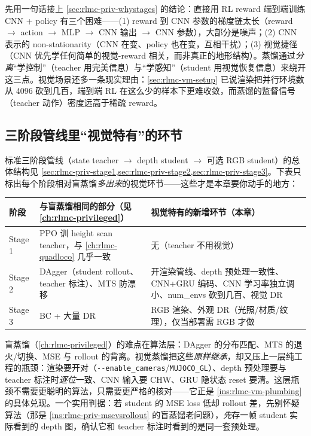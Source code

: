 先用一句话接上 \cref{sec:rlmc-priv-whystages} 的结论：直接用 RL reward 端到端训练 CNN + policy 有三个困难——(1) reward 到 CNN 参数的梯度链太长（reward $\to$ action $\to$ MLP $\to$ CNN 输出 $\to$ CNN 参数），大部分是噪声；(2) CNN 表示的 non-stationarity（CNN 在变、policy 也在变，互相干扰）；(3) 视觉捷径（CNN 优先学任何简单的视觉-reward 相关，而非真正的地形结构）。蒸馏通过\emph{分离}“学控制”（teacher 用完美信息）与“学感知”（student 用视觉恢复信息）来绕开这三点。视觉场景还多一条现实理由：\cref{sec:rlmc-vm-setup} 已说渲染把并行环境数从 4096 砍到几百，端到端 RL 在这么少的样本下更难收敛，而蒸馏的监督信号（teacher 动作）密度远高于稀疏 reward。

\subsection{三阶段管线里“视觉特有”的环节}
\label{sec:rlmc-vm-stages-vision}

标准三阶段管线（state teacher $\to$ depth student $\to$ 可选 RGB student）的总体结构见 \cref{sec:rlmc-priv-stage1,sec:rlmc-priv-stage2,sec:rlmc-priv-stage3}。下表只标出每个阶段相对盲蒸馏\emph{多出来}的视觉环节——这些才是本章要你动手的地方：

\begin{center}
\small
\begin{tabular}{@{}p{1.7cm}p{4.4cm}p{5.6cm}@{}}
\toprule
阶段 & 与盲蒸馏相同的部分（见 \cref{ch:rlmc-privileged}） & 视觉特有的新增环节（本章） \\
\midrule
Stage 1 & PPO 训 height scan teacher，与 \cref{ch:rlmc-quadloco} 几乎一致 & 无（teacher 不用视觉） \\
Stage 2 & DAgger（student rollout、teacher 标注）、MTS 防漂移 & 开渲染管线、depth 预处理一致性、CNN+GRU 编码、CNN 学习率独立调小、num\_envs 砍到几百、视觉 DR \\
Stage 3 & BC + 大量 DR & RGB 渲染、外观 DR（光照/材质/纹理），仅当部署需 RGB 才做 \\
\bottomrule
\end{tabular}
\end{center}

\begin{insight}\label{ins:rlmc-vm-bottleneck}
盲蒸馏（\cref{ch:rlmc-privileged}）的难点在算法层：DAgger 的分布匹配、MTS 的退火/切换、MSE 与 rollout 的背离。视觉蒸馏把这些\emph{原样继承}，却又压上一层纯工程的瓶颈：渲染要开对（\verb|--enable_cameras|/\verb|MUJOCO_GL|）、depth 预处理要与 teacher 标注时\emph{逐位}一致、CNN 输入要 CHW、GRU 隐状态 reset 要清。这层瓶颈不需要更聪明的算法，只需要更严格的核对——它正是 \cref{ins:rlmc-vm-plumbing} 的具体兑现。一个实用判据：若 student 的 MSE loss 低却 rollout 差，先别怀疑算法（那是 \cref{ins:rlmc-priv-msevsrollout} 的盲蒸馏老问题），\emph{先}存一帧 student 实际看到的 depth 图，确认它和 teacher 标注时看到的是同一套预处理。
\end{insight}

